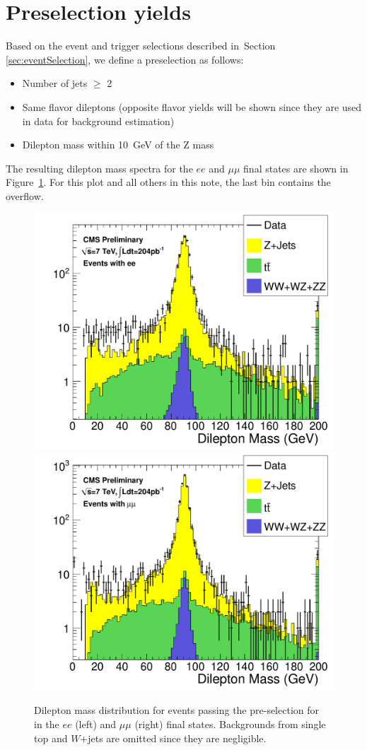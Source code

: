 \section{Preselection yields}
\label{sec:yields}

Based on the event and trigger selections described in~Section \ref{sec:eventSelection}, 
we define a preselection as follows:
\begin{itemize}
\item Number of jets $\geq$ 2
\item Same flavor dileptons (opposite flavor yields will be shown since 
  they are used in data for \ttbar background estimation)
\item Dilepton mass within 10~GeV of the Z mass
\end{itemize}
The resulting dilepton mass spectra for the $ee$ and $\mu\mu$ final states are shown in Figure~\ref{fig:dilmass}.
For this plot and all others in this note, the last bin contains the overflow.

\begin{figure}[hbt]
  \begin{center}
	\includegraphics[width=0.48\linewidth]{plots/hdilmass_ee_allj.pdf}
	\includegraphics[width=0.48\linewidth]{plots/hdilmass_mm_allj.pdf}
	\caption{
	  \label{fig:dilmass}\protect 
	  Dilepton mass distribution for events passing the pre-selection for \lumi~
	  in the $ee$ (left) and $\mu\mu$ (right) final states. Backgrounds from 
	  single top and $W$+jets are omitted
	  since they are negligible.}
  \end{center}
\end{figure}


